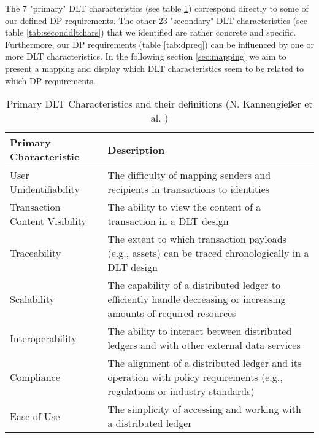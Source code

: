 The 7 "primary" DLT characteristics (see table \ref{tab:primarydltchar}) correspond directly to some of our defined DP requirements. The other 23 "secondary" DLT characteristics (see table \ref{tab:seconddltchars}) that we identified are rather concrete and specific. Furthermore, our DP requirements (table \ref{tab:dpreq}) can be influenced by one or more DLT characteristics. In the following section \ref{sec:mapping} we aim to present a mapping and display which DLT characteristics seem to be related to which DP requirements.  
\begin{table}[H]
    \centering
    \caption{Primary DLT Characteristics and their definitions (N. Kannengießer et al. \cite{dlt_4})}
    \label{tab:primarydltchar}
\begin{tabular}{|m{5cm}|m{10cm}|}
\hline
\cellcolor{gray!15}\textbf{Primary Characteristic} & \cellcolor{gray!15}\textbf{Description} \\ \hline\hline
User Unidentifiability & \rule{0pt}{2ex}The difficulty of mapping senders and recipients in transactions to identities \\ \hline
Transaction Content \newline Visibility & The ability to view the content of a transaction in a DLT design \\ \hline
Traceability & The extent to which transaction payloads (e.g., assets) can be traced chronologically in a DLT design\\ \hline\hline
Scalability & The capability of a distributed ledger to efficiently handle decreasing or increasing amounts of required resources \\ \hline\hline
Interoperability & The ability to interact between distributed ledgers and with other external data services \\ \hline\hline
Compliance & The alignment of a distributed ledger and its operation with policy requirements (e.g., regulations or industry standards) \\ \hline\hline
Ease of Use & The simplicity of accessing and working with a distributed ledger \\ \hline
\end{tabular}

    
\end{table}


